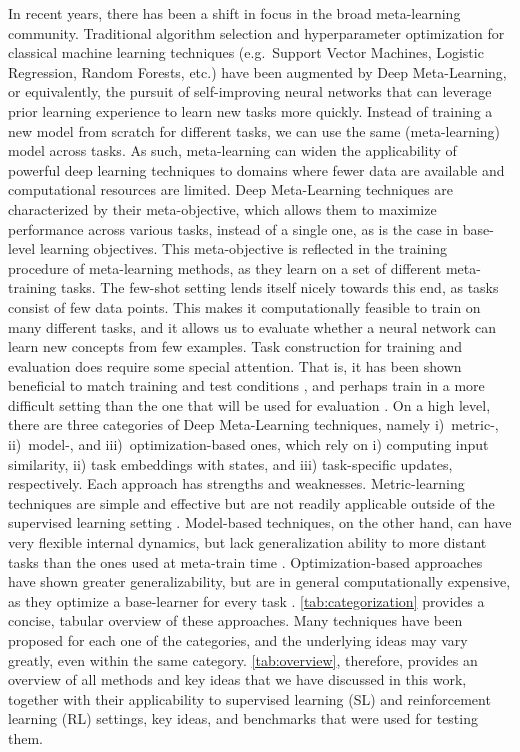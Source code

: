 In recent years, there has been a shift in focus in the broad meta-learning community. Traditional algorithm selection and hyperparameter optimization for classical machine learning techniques (e.g.\ Support Vector Machines, Logistic Regression, Random Forests, etc.) have been augmented by Deep Meta-Learning, or equivalently, the pursuit of self-improving neural networks that can leverage prior learning experience to learn new tasks more quickly. Instead of training a new model from scratch for different tasks, we can use the same (meta-learning) model across tasks. As such, meta-learning can widen the applicability of powerful deep learning techniques to domains where fewer data are available and computational resources are limited.
Deep Meta-Learning techniques are characterized by their meta-objective, which allows them to maximize performance across various tasks, instead of a single one, as is the case in base-level learning objectives. This meta-objective is reflected in the training procedure of meta-learning methods, as they learn on a set of different meta-training tasks. The few-shot setting lends itself nicely towards this end, as tasks consist of few data points. This makes it computationally feasible to train on many different tasks, and it allows us to evaluate whether a neural network can learn new concepts from few examples. 
Task construction for training and evaluation does require some special attention. That is, it has been shown beneficial to match training and test conditions , and perhaps train in a more difficult setting than the one that will be used for evaluation . 
On a high level, there are three categories of Deep Meta-Learning techniques, namely i)~metric-, ii)~model-, and iii)~optimization-based ones, which rely on i) computing input similarity, ii) task embeddings with states, and iii) task-specific updates, respectively. Each approach has strengths and weaknesses. Metric-learning techniques are simple and effective  but are not readily applicable outside of the supervised learning setting . Model-based techniques, on the other hand, can have very flexible internal dynamics, but lack generalization ability to more distant tasks than the ones used at meta-train time . Optimization-based approaches have shown greater generalizability, but are in general computationally expensive, as they optimize a base-learner for every task .
\autoref{tab:categorization} provides a concise, tabular overview of these approaches. Many techniques have been proposed for each one of the categories, and the underlying ideas may vary greatly, even within the same category. \autoref{tab:overview}, therefore, provides an overview of all methods and key ideas that we have discussed in this work, together with their applicability to supervised learning (SL) and reinforcement learning (RL) settings, key ideas, and benchmarks that were used for testing them. 
